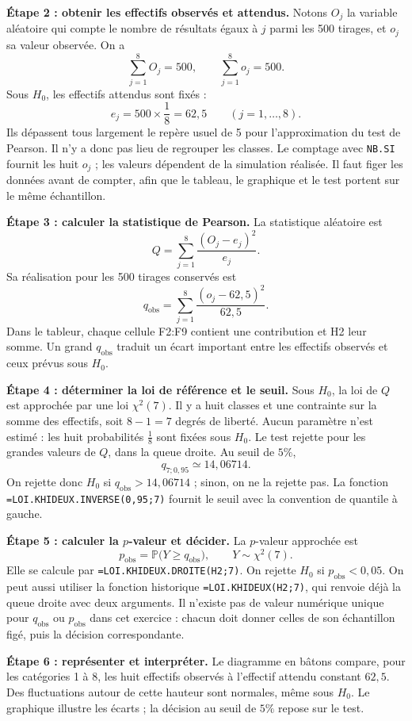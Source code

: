 {{\textbf{Étape 2 : obtenir les effectifs observés et attendus.} Notons $O_j$ la variable aléatoire qui compte le nombre de résultats égaux à $j$ parmi les 500 tirages, et $o_j$ sa valeur observée. On a
\[
\sum_{j=1}^8 O_j=500,\qquad \sum_{j=1}^8 o_j=500.
\]
Sous $H_0$, les effectifs attendus sont fixés :
\[
e_j=500\times\frac18=62{,}5\qquad (j=1,\ldots,8).
\]
Ils dépassent tous largement le repère usuel de 5 pour l'approximation du test de Pearson. Il n'y a donc pas lieu de regrouper les classes. Le comptage avec \texttt{NB.SI} fournit les huit $o_j$ ; les valeurs dépendent de la simulation réalisée. Il faut figer les données avant de compter, afin que le tableau, le graphique et le test portent sur le même échantillon.

\textbf{Étape 3 : calculer la statistique de Pearson.} La statistique aléatoire est
\[
Q=\sum_{j=1}^8\frac{(O_j-e_j)^2}{e_j}.
\]
Sa réalisation pour les 500 tirages conservés est
\[
q_{\mathrm{obs}}=\sum_{j=1}^8\frac{(o_j-62{,}5)^2}{62{,}5}.
\]
Dans le tableur, chaque cellule F2:F9 contient une contribution et H2 leur somme. Un grand $q_{\mathrm{obs}}$ traduit un écart important entre les effectifs observés et ceux prévus sous $H_0$.

\textbf{Étape 4 : déterminer la loi de référence et le seuil.} Sous $H_0$, la loi de $Q$ est approchée par une loi $\chi^2(7)$. Il y a huit classes et une contrainte sur la somme des effectifs, soit $8-1=7$ degrés de liberté. Aucun paramètre n'est estimé : les huit probabilités $\frac18$ sont fixées sous $H_0$.
Le test rejette pour les grandes valeurs de $Q$, dans la queue droite. Au seuil de $5\%$,
\[
q_{7;0{,}95}\simeq14{,}06714.
\]
On rejette donc $H_0$ si $q_{\mathrm{obs}}>14{,}06714$ ; sinon, on ne la rejette pas. La fonction \texttt{=LOI.KHIDEUX.INVERSE(0,95;7)} fournit le seuil avec la convention de quantile à gauche.

\textbf{Étape 5 : calculer la $p$-valeur et décider.} La $p$-valeur approchée est
\[
p_{\mathrm{obs}}=\mathbb P\bigl(Y\geq q_{\mathrm{obs}}\bigr),\qquad Y\sim\chi^2(7).
\]
Elle se calcule par \texttt{=LOI.KHIDEUX.DROITE(H2;7)}. On rejette $H_0$ si $p_{\mathrm{obs}}<0{,}05$. On peut aussi utiliser la fonction historique \texttt{=LOI.KHIDEUX(H2;7)}, qui renvoie déjà la queue droite avec deux arguments.
Il n'existe pas de valeur numérique unique pour $q_{\mathrm{obs}}$ ou $p_{\mathrm{obs}}$ dans cet exercice : chacun doit donner celles de son échantillon figé, puis la décision correspondante.

\textbf{Étape 6 : représenter et interpréter.} Le diagramme en bâtons compare, pour les catégories 1 à 8, les huit effectifs observés à l'effectif attendu constant $62{,}5$. Des fluctuations autour de cette hauteur sont normales, même sous $H_0$. Le graphique illustre les écarts ; la décision au seuil de $5\%$ repose sur le test.

}}
